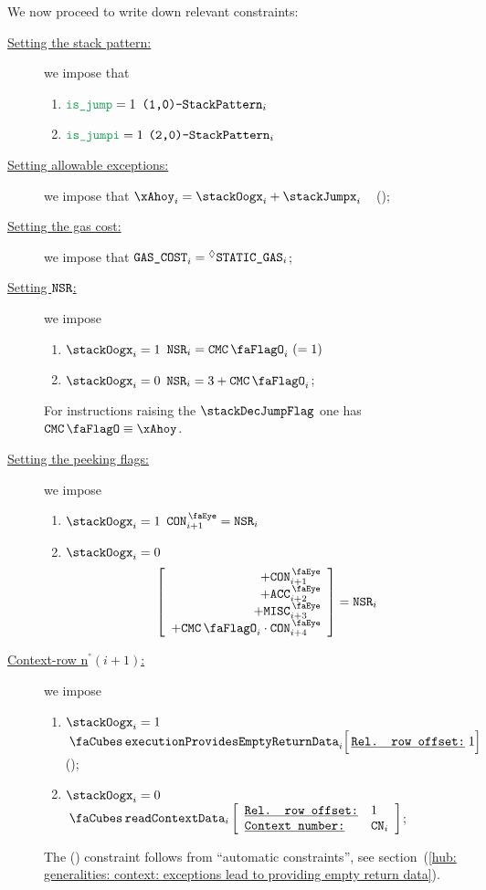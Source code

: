 We now proceed to write down relevant constraints:
\begin{description}
	\item[\underline{Setting the stack pattern:}]
		we impose that
		\begin{enumerate}
			\item \If $\locIsJump      = 1$ \Then $\texttt{(1,0)-}\texttt{StackPattern}_{i}$
			\item \If $\locIsJumpi     = 1$ \Then $\texttt{(2,0)-}\texttt{StackPattern}_{i}$
		\end{enumerate}
	\item[\underline{Setting allowable exceptions:}]
		we impose that $\xAhoy_{i} = \stackOogx_{i} + \stackJumpx_{i}$ ~ (\trash);
	\item[\underline{Setting the gas cost:}]
		we impose that $\texttt{GAS}\texttt{\_COST}_{i} = \prescript{\lozenge}{}{\texttt{STATIC\_GAS}}_{i}$;
	\item[\underline{Setting $\texttt{NSR}$:}]
		we impose
		\begin{enumerate}
			\item \If $\stackOogx_{i} = 1$ \Then $\nonStackRows_{i} = \cmc_{i}~(=1)$
			\item \If $\stackOogx_{i} = 0$ \Then $\nonStackRows_{i} = 3 + \cmc_{i}$;
		\end{enumerate}
		\saNote{} For instructions raising the $\stackDecJumpFlag$ one has $\cmc \equiv \xAhoy$.
	\item[\underline{Setting the peeking flags:}]
		we impose 
		\begin{enumerate}
			\item \If $\stackOogx_{i} = 1$ \Then $ \peekContext_{i + 1} = \nonStackRows_{i} $
			\item \If $\stackOogx_{i} = 0$ \Then
				\[
					\left[ \begin{array}{r}
						+ \peekContext                _{i + 1} \\
						+ \peekAccount                _{i + 2} \\
						+ \peekMisc                   _{i + 3} \\
						+ \cmc_{i} \cdot \peekContext _{i + 4} \\
					\end{array} \right]
					= \nonStackRows_{i}
				\]
		\end{enumerate}
	\item[\underline{Context-row n$^°(i + 1)$:}]
		we impose
		\begin{enumerate}
			\item \If $\stackOogx_{i} = 1$ \Then $\executionProvidesEmptyReturnData {i}{1} $ \quad (\trash);
			\item \If $\stackOogx_{i} = 0$ \Then $\readContextData {i}{1}{\cn_{i}}$;
		\end{enumerate}
		\saNote{}
		The (\trash) constraint follows from ``automatic constraints'',
		see section~(\ref{hub: generalities: context: exceptions lead to providing empty return data}).
\end{description}
